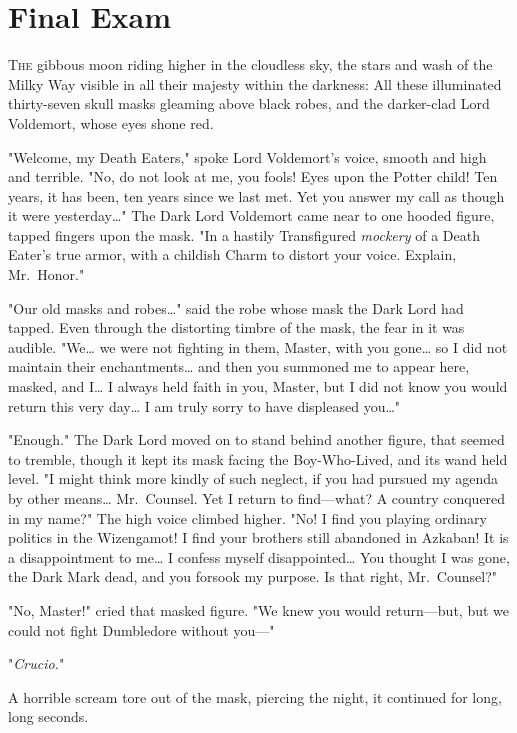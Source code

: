 \chapter{Final Exam}

\lettrine{T}{he} gibbous moon
riding higher in the cloudless sky, the stars and wash of the Milky Way visible
in all their majesty within the darkness: All these illuminated thirty-seven
skull masks gleaming above black robes, and the darker-clad Lord Voldemort,
whose eyes shone red.

"Welcome, my Death Eaters," spoke Lord Voldemort's voice, smooth and high and
terrible. "No, do not look at me, you fools! Eyes upon the Potter child! Ten
years, it has been, ten years since we last met. Yet you answer my call as
though it were yesterday{\ldots}" The Dark Lord Voldemort came near to one
hooded figure, tapped fingers upon the mask. "In a hastily Transfigured
\emph{mockery} of a Death Eater's true armor, with a childish Charm to distort
your voice. Explain, Mr.~Honor."

"Our old masks and robes{\ldots}" said the robe whose mask the Dark Lord had
tapped. Even through the distorting timbre of the mask, the fear in it was
audible. "We{\ldots} we were not fighting in them, Master, with you
gone{\ldots} so I did not maintain their enchantments{\ldots} and then you
summoned me to appear here, masked, and I{\ldots} I always held faith in you,
Master, but I did not know you would return this very day{\ldots} I am truly
sorry to have displeased you{\ldots}"

"Enough." The Dark Lord moved on to stand behind another figure, that seemed to
tremble, though it kept its mask facing the Boy-Who-Lived, and its wand held
level. "I might think more kindly of such neglect, if you had pursued my agenda
by other means{\ldots} Mr.~Counsel. Yet I return to find---what? A country
conquered in my name?" The high voice climbed higher. "No! I find you playing
ordinary politics in the Wizengamot! I find your brothers still abandoned in
Azkaban! It is a disappointment to me{\ldots} I confess myself
disappointed{\ldots} You thought I was gone, the Dark Mark dead, and you
forsook my purpose. Is that right, Mr.~Counsel?"

"No, Master!" cried that masked figure. "We knew you would return---but, but we
could not fight Dumbledore without you---"

"\emph{Crucio.}"

A horrible scream tore out of the mask, piercing the night, it continued for
long, long seconds.

